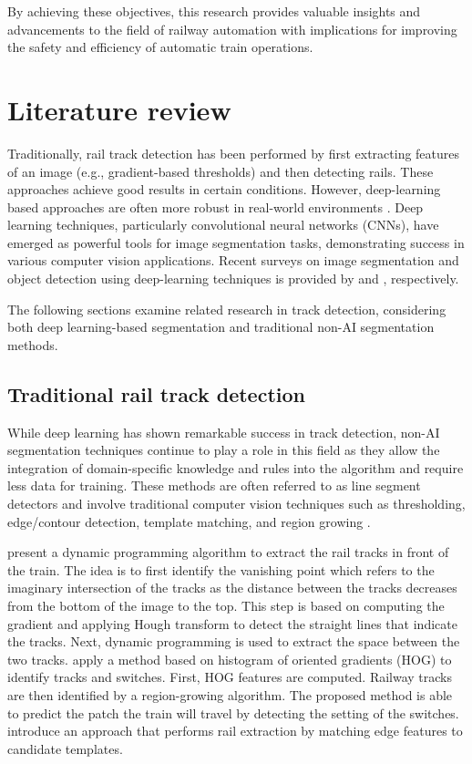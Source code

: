 \documentclass[Master,MDS,english]{BASE/twbook} %
\begin{document}
By achieving these objectives, this research provides valuable insights and advancements to the field of railway automation with implications for improving the safety and efficiency of automatic train operations.




\chapter{Literature review} %

Traditionally, rail track detection has been performed by first extracting features of an image (e.g., gradient-based thresholds) and then detecting rails. These approaches achieve good results in certain conditions. However, deep-learning based approaches are often more robust in real-world environments \citep{7350873, 8859360, 10.1145/3503161.3548050}.
Deep learning techniques, particularly convolutional neural networks (CNNs), have emerged as powerful tools for image segmentation tasks, demonstrating success in various computer vision applications. Recent surveys on image segmentation and object detection using deep-learning techniques is provided by \cite{cmc.2023.032757} and \cite{ZAIDI2022103514}, respectively.

The following sections examine related research in track detection, considering both deep learning-based segmentation and traditional non-AI segmentation methods.



\section{Traditional rail track detection}

While deep learning has shown remarkable success in track detection, non-AI segmentation techniques continue to play a role in this field as they allow the integration of domain-specific knowledge and rules into the algorithm and require less data for training. These methods are often referred to as line segment detectors and involve traditional computer vision techniques such as thresholding, edge/contour detection, template matching, and region growing \citep{4731268, ipol.2012.gjmr-lsd, 8100103, SAHOO1988233, Mittal2022}.

\cite{5309526} present a dynamic programming algorithm to extract the rail tracks in front of the train. The idea is to first identify the vanishing point which refers to the imaginary intersection of the tracks as the distance between the tracks decreases from the bottom of the image to the top.  This step is based on computing the gradient and applying Hough transform to detect the straight lines that indicate the tracks. Next, dynamic programming is used to extract the space between the two tracks.
 \cite{qi2013efficient} apply a method based on histogram of oriented gradients (HOG) to identify tracks and switches. First, HOG features are computed.  Railway tracks are then identified by a region-growing algorithm. The proposed method is able to predict the patch the train will travel by detecting the setting of the switches. 
\cite{5940410} introduce an approach that performs rail extraction by matching edge features to candidate templates.
\end{document}
